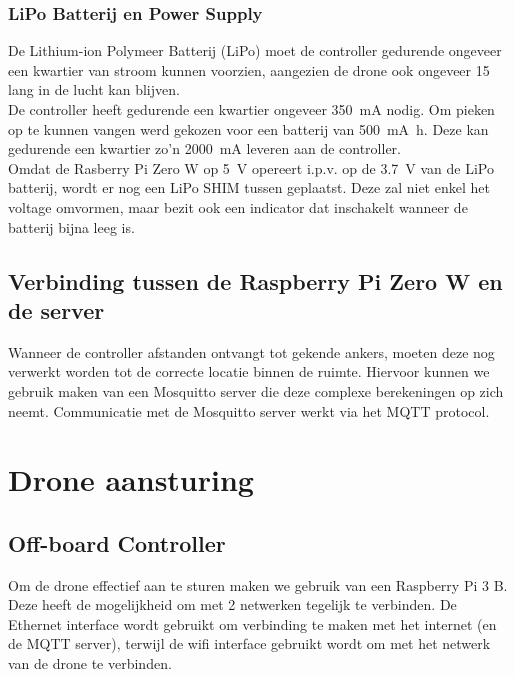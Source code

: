 \subsubsection{LiPo Batterij en Power Supply} \label{sec:lipo}
De Lithium-ion Polymeer Batterij (LiPo) moet de controller gedurende ongeveer een kwartier van stroom kunnen voorzien, aangezien de drone ook ongeveer \SI{15}{\min} lang in de lucht kan blijven.\\
De controller heeft gedurende een kwartier ongeveer \SI{350}{\mA} nodig.
Om pieken op te kunnen vangen werd gekozen voor een batterij van \SI{500}{\mA\hour}.
Deze kan gedurende een kwartier zo'n \SI{2000}{\mA} leveren aan de controller.\\

Omdat de Rasberry Pi Zero W op \SI{5}{\V} opereert i.p.v. op de \SI{3.7}{\V} van de LiPo batterij, wordt er nog een LiPo SHIM tussen geplaatst. Deze zal niet enkel het voltage omvormen, maar bezit ook een indicator dat inschakelt wanneer de batterij bijna leeg is.

\subsection{Verbinding tussen de Raspberry Pi Zero W en de server} \label{sec:raspberry_server}
Wanneer de controller afstanden ontvangt tot gekende ankers, moeten deze nog verwerkt worden tot de correcte locatie binnen de ruimte.
Hiervoor kunnen we gebruik maken van een Mosquitto server die deze complexe berekeningen op zich neemt.
Communicatie met de Mosquitto server werkt via het MQTT protocol.

\section{Drone aansturing} \label{sec:drone_control}
\subsection{Off-board Controller} \label{sec:offboard_controller}
Om de drone effectief aan te sturen maken we gebruik van een Raspberry Pi 3 B.
Deze heeft de mogelijkheid om met 2 netwerken tegelijk te verbinden. De Ethernet interface wordt gebruikt om verbinding te maken met het internet (en de MQTT server), terwijl de wifi interface gebruikt wordt om met het netwerk van de drone te verbinden.\\


